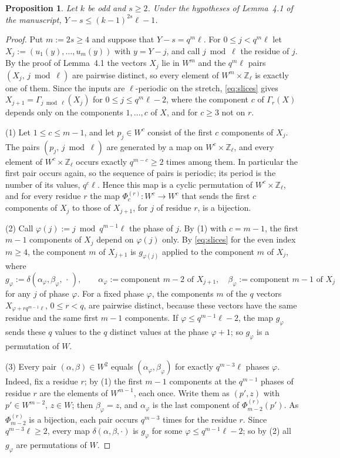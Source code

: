 \documentclass[11pt]{article}
\newtheorem{proposition}[lemma]{Proposition}
\theoremstyle{remark}
\begin{document}
\begin{proposition}\label{prop:lbparity}
Let $k$ be odd and $s\ge2$. Under the hypotheses of Lemma~4.1 of the manuscript,
$Y-s\le(k-1)^{2s}\ell-1$.
\end{proposition}
\begin{proof}
Put $m:=2s\ge4$ and suppose that $Y-s=q^m\ell$. For $0\le j<q^m\ell$ let $X_j:=(u_1(y),\dots,u_m(y))$ with
$y=Y-j$, and call $j\bmod\ell$ the residue of $j$. By the proof of Lemma~4.1 the vectors $X_j$ lie in $W^m$ and
the $q^m\ell$ pairs $(X_j,\,j\bmod\ell)$ are pairwise distinct, so every element of $W^m\times\mathbb Z_\ell$
is exactly one of them. Since the inputs are $\ell$-periodic on the stretch, \eqref{eq:slices} gives
$X_{j+1}=\Gamma_{j\bmod\ell}(X_j)$ for $0\le j\le q^m\ell-2$, where the component $c$ of $\Gamma_r(X)$ depends
only on the components $1,\dots,c$ of $X$, and for $c\ge3$ not on $r$.

(1) Let $1\le c\le m-1$, and let $p_j\in W^c$ consist of the first $c$ components of $X_j$. The pairs
$(p_j,\,j\bmod\ell)$ are generated by a map on $W^c\times\mathbb Z_\ell$, and every element of
$W^c\times\mathbb Z_\ell$ occurs exactly $q^{m-c}\ge2$ times among them. In particular the first pair occurs
again, so the sequence of pairs is periodic; its period is the number of its values, $q^c\ell$. Hence this
map is a cyclic permutation of $W^c\times\mathbb Z_\ell$, and for every residue $r$ the map
$\Phi_c^{(r)}\colon W^c\to W^c$ that sends the first $c$ components of $X_j$ to those of $X_{j+1}$, for $j$ of
residue $r$, is a bijection.

(2) Call $\varphi(j):=j\bmod q^{m-1}\ell$ the phase of $j$. By (1) with $c=m-1$, the first $m-1$ components of
$X_j$ depend on $\varphi(j)$ only. By \eqref{eq:slices} for the even index $m\ge4$, the component $m$ of
$X_{j+1}$ is $g_{\varphi(j)}$ applied to the component $m$ of $X_j$, where
\[
g_\varphi:=\delta(\alpha_\varphi,\beta_\varphi,\,\cdot\,),\qquad
\alpha_\varphi:=\text{component }m-2\text{ of }X_{j+1},\quad \beta_\varphi:=\text{component }m-1\text{ of }X_j
\]
for any $j$ of phase $\varphi$. For a fixed phase $\varphi$, the components $m$ of the $q$ vectors
$X_{\varphi+rq^{m-1}\ell}$, $0\le r<q$, are pairwise distinct, because these vectors have the same residue and
the same first $m-1$ components. If $\varphi\le q^{m-1}\ell-2$, the map $g_\varphi$ sends these $q$ values to
the $q$ distinct values at the phase $\varphi+1$; so $g_\varphi$ is a permutation of $W$.

(3) Every pair $(\alpha,\beta)\in W^2$ equals $(\alpha_\varphi,\beta_\varphi)$ for exactly $q^{m-3}\ell$ phases
$\varphi$. Indeed, fix a residue $r$; by (1) the first $m-1$ components at the $q^{m-1}$ phases of residue
$r$ are the elements of $W^{m-1}$, each once. Write them as $(p',z)$ with $p'\in W^{m-2}$, $z\in W$; then
$\beta_\varphi=z$, and $\alpha_\varphi$ is the last component of $\Phi_{m-2}^{(r)}(p')$. As $\Phi_{m-2}^{(r)}$
is a bijection, each pair occurs $q^{m-3}$ times for the residue $r$. Since $q^{m-3}\ell\ge2$, every map
$\delta(\alpha,\beta,\cdot)$ is $g_\varphi$ for some $\varphi\le q^{m-1}\ell-2$; so by (2) all $g_\varphi$ are
permutations of $W$.


\end{proof}
\end{document}
